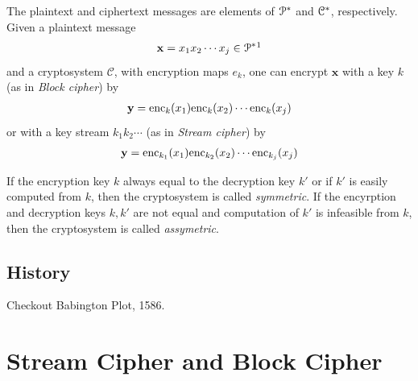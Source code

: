 \documentclass[a4paper, 12pt]{book} %
\begin{document}
The plaintext and ciphertext messages are elements of $\EuScript{P}^*$ and $\EuScript{C}^*$, respectively. Given a plaintext message 
\begin{align}
    \mathbf{x} = x_1 x_2 \cdots x_{j}  \in \EuScript{P}^* \footnotemark 
\end{align}
and a cryptosystem $\mathscr{C}$, with encryption maps $e_k$, one can encrypt $\mathbf{x}$ with a key $k$ (as in \emph{Block cipher}) by 
\begin{align}
    \mathbf{y} = \mathrm{enc}_k(x_1) \mathrm{enc}_k(x_2) \cdots \mathrm{enc}_k(x_{j})
\end{align}
or with a key stream $k_1k_2\cdots $ (as in \emph{Stream cipher})  by
\begin{align}
    \mathbf{y} = \mathrm{enc}_{k_1}(x_1) \mathrm{enc}_{k_2}(x_2) \cdots \mathrm{enc}_{k_j}(x_j)
\end{align}

If the encryption key $k$ always equal to the decryption key $k'$ or if $k'$ is easily computed from $k$, then the cryptosystem is called \emph{symmetric}. If the encyrption and decryption keys $k, k'$ are not equal and computation of $k'$ is infeasible from $k$, then the cryptosystem is called \emph{assymetric}.



\section{History}

Checkout Babington Plot, 1586.





\chapter{Stream Cipher and Block Cipher}
\end{document}
